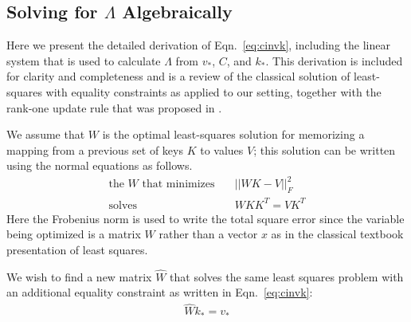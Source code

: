 \documentclass{article}
\newcommand{\refeqn}[1]{Eqn.~\ref{eq:#1}}
\newcommand{\lbleq}[1]{\label{eq:#1}}
\begin{document}
\begin{appendices}


\appendix

\section{Solving for \texorpdfstring{$\Lambda$}{Lambda} Algebraically}
\label{apd:solving-v}
Here we present the detailed derivation of \refeqn{cinvk}, including the linear system that is used to calculate $\Lambda$ from $v_*$, $C$, and $k_*$.  This derivation is included for clarity and completeness and is a review of the classical solution of least-squares with equality constraints as applied to our setting, together with the rank-one update rule that was proposed in \citet{bau-rewriting}.

We assume that $W$ is the optimal least-squares solution for memorizing a mapping from a previous set of keys $K$ to values $V$; this solution can be written using the normal equations as follows.
\begin{align}
\text{the $W$ that minimizes} \quad &|| W K - V ||_F^2 \\
\text{solves} \quad    & W K K^T = V K^T
\lbleq{normal-eq}
\end{align}
Here the Frobenius norm is used to write the total square error since the variable being optimized is a matrix $W$ rather than a vector $x$ as in the classical textbook presentation of least squares.

We wish to find a new matrix $\hat{W}$ that solves the same least squares problem with an additional equality constraint as written in \refeqn{cinvk}:
\begin{align}
    \hat{W}k_* = v_*
    \lbleq{eq-constraint}
\end{align}


\end{appendices}
\end{document}
